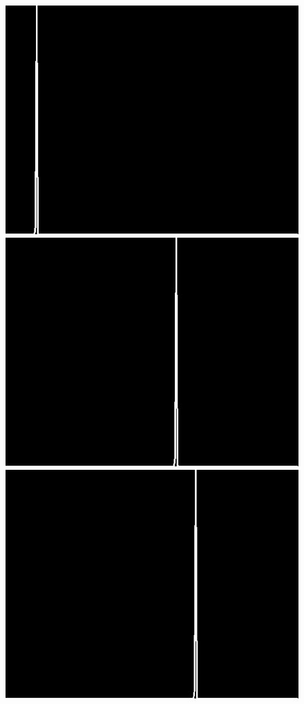 \documentclass[12pt]{report}
\begin{document}
\begin{figure}[H]
\begin{center}
\includegraphics[scale=0.25]{../ImageRes/dct_masked2_histo_0.jpg} 
\includegraphics[scale=0.25]{../ImageRes/dct_masked2_histo_1.jpg} 
\includegraphics[scale=0.25]{../ImageRes/dct_masked2_histo_2.jpg} 

\end{center}
\end{figure}
\end{document}
